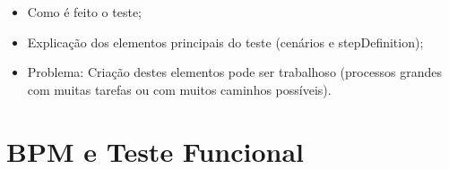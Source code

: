 \documentclass[12pt]{article}
\begin{document}






 \begin{itemize}
   \item Como é feito o teste;
   \item Explicação dos elementos principais do teste (cenários e stepDefinition);
   \item Problema: Criação destes elementos pode ser trabalhoso (processos grandes com muitas tarefas ou com muitos caminhos possíveis).
 \end{itemize}
 
	
\section{BPM e Teste Funcional}
\end{document}
